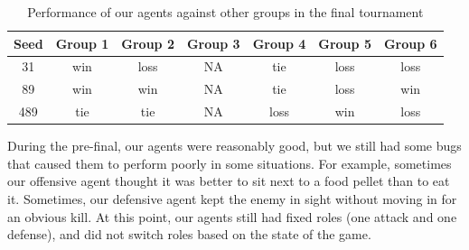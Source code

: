\documentclass[a4paper,12pt]{article}
\begin{document}




\begin{table}[!hptb]
  \centering
  \begin{tabular}{|c|c|c|c|c|c|c|}
    \hline
    \textbf{Seed} & \textbf{Group 1} & \textbf{Group 2} & \textbf{Group 3} & \textbf{Group 4} & \textbf{Group 5} & \textbf{Group 6} \\
    \hline
    31 & win & loss & NA & tie & loss & loss \\
    \hline
    89 & win & win & NA & tie & loss & win \\
    \hline
    489 & tie & tie & NA & loss & win & loss \\
    \hline
  \end{tabular}
  \caption{Performance of our agents against other groups in the final tournament}
  \label{tab:results_final}
\end{table}

During the pre-final, our agents were reasonably good, but we still had some bugs that caused them to perform poorly in some situations. For example, sometimes our offensive agent thought it was better to sit next to a food pellet than to eat it. Sometimes, our defensive agent kept the enemy in sight without moving in for an obvious kill. At this point, our agents still had fixed roles (one attack and one defense), and did not switch roles based on the state of the game.
\end{document}
